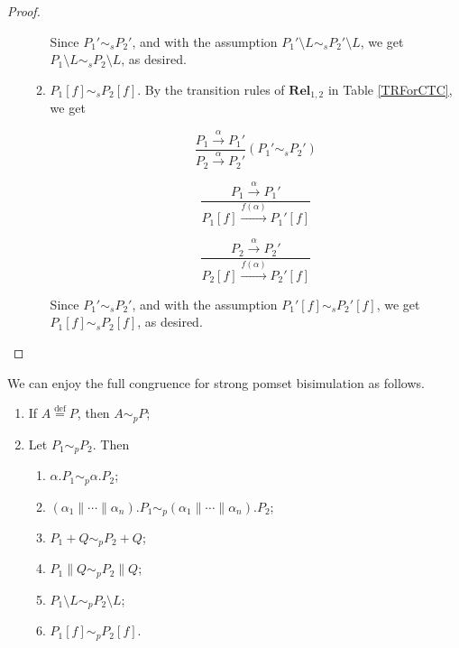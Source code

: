 \begin{proof}
\begin{enumerate}
\begin{enumerate}
           Since $P_1'\sim_s P_2'$, and with the assumption $P_1'\setminus L\sim_s P_2'\setminus L$, we get $P_1\setminus L\sim_s P_2\setminus L$, as desired.
           \item $P_1[f]\sim_s P_2[f]$. By the transition rules of $\textbf{Rel}_{1,2}$ in Table \ref{TRForCTC}, we get

           $$\frac{P_1\xrightarrow{\alpha}P_1'}{P_2\xrightarrow{\alpha}P_2'}(P_1'\sim_s P_2')$$

           $$\frac{P_1\xrightarrow{\alpha}P_1'}{P_1[f]\xrightarrow{f(\alpha)}P_1'[f]}$$

           $$\frac{P_2\xrightarrow{\alpha}P_2'}{P_2[f]\xrightarrow{f(\alpha)}P_2'[f]}$$

           Since $P_1'\sim_s P_2'$, and with the assumption $P_1'[f]\sim_s P_2'[f]$, we get $P_1[f]\sim_s P_2[f]$, as desired.
         \end{enumerate}
\end{enumerate}
\end{proof}

\begin{theorem} \label{CSPB}
We can enjoy the full congruence for strong pomset bisimulation as follows.
\begin{enumerate}
  \item If $A\overset{\text{def}}{=}P$, then $A\sim_p P$;
  \item Let $P_1\sim_p P_2$. Then
        \begin{enumerate}
           \item $\alpha.P_1\sim_p \alpha.P_2$;
           \item $(\alpha_1\parallel\cdots\parallel\alpha_n).P_1\sim_p (\alpha_1\parallel\cdots\parallel\alpha_n).P_2$;
           \item $P_1+Q\sim_p P_2 +Q$;
           \item $P_1\parallel Q\sim_p P_2\parallel Q$;
           \item $P_1\setminus L\sim_p P_2\setminus L$;
           \item $P_1[f]\sim_p P_2[f]$.
         \end{enumerate}
\end{enumerate}
\end{theorem}

